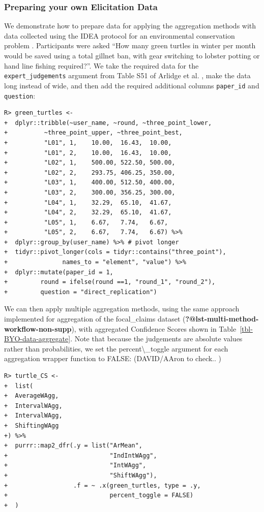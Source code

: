 \documentclass[article]{jss}
\begin{document}
\hypertarget{preparing-your-own-elicitation-data}{%
\subsubsection{Preparing your own Elicitation
Data}\label{preparing-your-own-elicitation-data}}

We demonstrate how to prepare data for applying the 
aggregation methods with data collected using the IDEA protocol for an
environmental conservation problem \citep{Arlidge2020} . Participants
were asked ``How many green turtles in winter per month would be saved
using a total gillnet ban, with gear switching to lobster potting or
hand line fishing required?''. We take the required data for the
\texttt{expert\_judgements} argument from Table S51 of Arlidge et al.
\citeyearpar{Arlidge2020}, make the data long instead of wide, and then
add the required additional columns \texttt{paper\_id} and
\texttt{question}:

\begin{verbatim}
R> green_turtles <- 
+  dplyr::tribble(~user_name, ~round, ~three_point_lower, 
+          ~three_point_upper, ~three_point_best,
+          "L01", 1,    10.00,  16.43,  10.00,
+          "L01", 2,    10.00,  16.43,  10.00,
+          "L02", 1,    500.00, 522.50, 500.00,
+          "L02", 2,    293.75, 406.25, 350.00,
+          "L03", 1,    400.00, 512.50, 400.00,
+          "L03", 2,    300.00, 356.25, 300.00,
+          "L04", 1,    32.29,  65.10,  41.67,
+          "L04", 2,    32.29,  65.10,  41.67,
+          "L05", 1,    6.67,   7.74,   6.67,
+          "L05", 2,    6.67,   7.74,   6.67) %>% 
+  dplyr::group_by(user_name) %>% # pivot longer
+  tidyr::pivot_longer(cols = tidyr::contains("three_point"), 
+               names_to = "element", "value") %>% 
+  dplyr::mutate(paper_id = 1, 
+         round = ifelse(round ==1, "round_1", "round_2"),
+         question = "direct_replication")
\end{verbatim}

We can then apply multiple aggregation methods, using the same approach
implemented for aggregation of the {focal\_claims} dataset
(\textbf{?@lst-multi-method-workflow-non-supp}), with aggregated
Confidence Scores shown in Table~\ref{tbl-BYO-data-aggregate}. Note that
because the judgements are absolute values rather than probabilities, we
set the {percent\textbackslash\_toggle} argument for each aggregation
wrapper function to {FALSE}: (DAVID/AAron to check.. )

\begin{verbatim}
R> turtle_CS <- 
+  list(
+  AverageWAgg,
+  IntervalWAgg,
+  IntervalWAgg,
+  ShiftingWAgg
+) %>%
+  purrr::map2_dfr(.y = list("ArMean",
+                            "IndIntWAgg",
+                            "IntWAgg",
+                            "ShiftWAgg"),
+                  .f = ~ .x(green_turtles, type = .y,
+                            percent_toggle = FALSE)
+  )
\end{verbatim}
\end{document}
